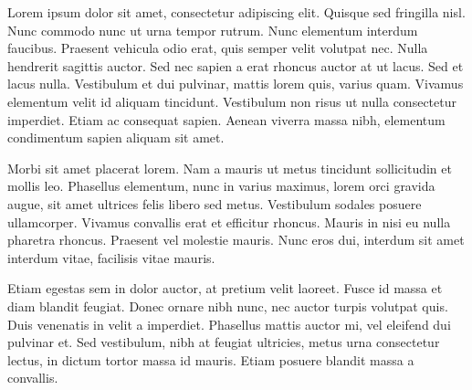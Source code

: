 \documentclass{ata-seccmo}
\begin{document}
\maketitle


Lorem ipsum dolor sit amet, consectetur adipiscing elit. Quisque sed fringilla
nisl. Nunc commodo nunc ut urna tempor rutrum. Nunc elementum interdum
faucibus. Praesent vehicula odio erat, quis semper velit volutpat nec. Nulla
hendrerit sagittis auctor. Sed nec sapien a erat rhoncus auctor at ut lacus.
Sed et lacus nulla. Vestibulum et dui pulvinar, mattis lorem quis, varius quam.
Vivamus elementum velit id aliquam tincidunt. Vestibulum non risus ut nulla
consectetur imperdiet. Etiam ac consequat sapien. Aenean viverra massa nibh,
elementum condimentum sapien aliquam sit amet.


Morbi sit amet placerat lorem. Nam a mauris ut metus tincidunt sollicitudin et
mollis leo. Phasellus elementum, nunc in varius maximus, lorem orci gravida
augue, sit amet ultrices felis libero sed metus. Vestibulum sodales posuere
ullamcorper. Vivamus convallis erat et efficitur rhoncus. Mauris in nisi eu
nulla pharetra rhoncus. Praesent vel molestie mauris. Nunc eros dui, interdum
sit amet interdum vitae, facilisis vitae mauris.

Etiam egestas sem in dolor auctor, at pretium velit laoreet. Fusce id massa et
diam blandit feugiat. Donec ornare nibh nunc, nec auctor turpis volutpat quis.
Duis venenatis in velit a imperdiet. Phasellus mattis auctor mi, vel eleifend
dui pulvinar et. Sed vestibulum, nibh at feugiat ultricies, metus urna
consectetur lectus, in dictum tortor massa id mauris. Etiam posuere blandit
massa a convallis.

\end{document}
